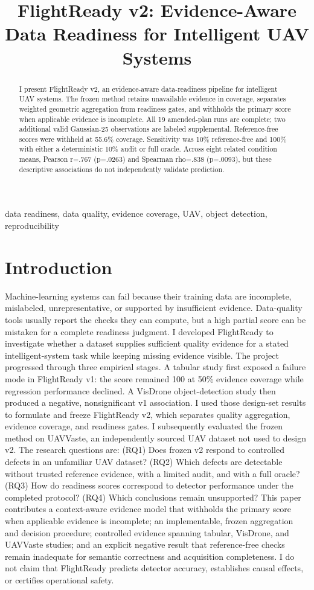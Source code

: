 \documentclass[conference]{IEEEtran}
\title{FlightReady v2: Evidence-Aware Data Readiness for Intelligent UAV Systems}
\author{\IEEEauthorblockN{Anonymous submission}\IEEEauthorblockA{Double-blind review}}
\begin{document}
\maketitle
\begin{abstract}I present FlightReady v2, an evidence-aware data-readiness pipeline for intelligent UAV systems. The frozen method retains unavailable evidence in coverage, separates weighted geometric aggregation from readiness gates, and withholds the primary score when applicable evidence is incomplete. All 19 amended-plan runs are complete; two additional valid Gaussian-25 observations are labeled supplemental. Reference-free scores were withheld at 55.6\% coverage. Sensitivity was 10\% reference-free and 100\% with either a deterministic 10\% audit or full oracle. Across eight related condition means, Pearson r=.767 (p=.0263) and Spearman rho=.838 (p=.0093), but these descriptive associations do not independently validate prediction.\end{abstract}
\begin{IEEEkeywords}data readiness, data quality, evidence coverage, UAV, object detection, reproducibility\end{IEEEkeywords}
\section{Introduction}
Machine-learning systems can fail because their training data are incomplete, mislabeled, unrepresentative, or supported by insufficient evidence. Data-quality tools usually report the checks they can compute, but a high partial score can be mistaken for a complete readiness judgment. I developed FlightReady to investigate whether a dataset supplies sufficient quality evidence for a stated intelligent-system task while keeping missing evidence visible.
The project progressed through three empirical stages. A tabular study first exposed a failure mode in FlightReady v1: the score remained 100 at 50\% evidence coverage while regression performance declined. A VisDrone object-detection study then produced a negative, nonsignificant v1 association. I used those design-set results to formulate and freeze FlightReady v2, which separates quality aggregation, evidence coverage, and readiness gates. I subsequently evaluated the frozen method on UAVVaste, an independently sourced UAV dataset not used to design v2.
The research questions are: (RQ1) Does frozen v2 respond to controlled defects in an unfamiliar UAV dataset? (RQ2) Which defects are detectable without trusted reference evidence, with a limited audit, and with a full oracle? (RQ3) How do readiness scores correspond to detector performance under the completed protocol? (RQ4) Which conclusions remain unsupported?
This paper contributes a context-aware evidence model that withholds the primary score when applicable evidence is incomplete; an implementable, frozen aggregation and decision procedure; controlled evidence spanning tabular, VisDrone, and UAVVaste studies; and an explicit negative result that reference-free checks remain inadequate for semantic correctness and acquisition completeness. I do not claim that FlightReady predicts detector accuracy, establishes causal effects, or certifies operational safety.
\end{document}
